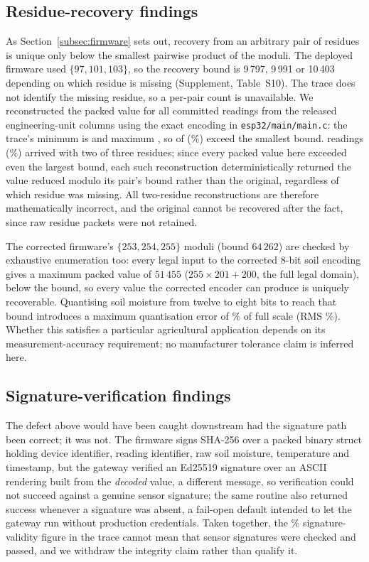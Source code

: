 \documentclass[a4paper,fleqn]{cas-dc}
\begin{document}
\subsection{Residue-recovery findings}
\label{subsec:pm_crt}

As Section~\ref{subsec:firmware} sets out, recovery from an arbitrary pair
of residues is unique only below the smallest pairwise product of the
moduli. The deployed firmware used $\{97, 101, 103\}$, so the recovery
bound is 9\,797, 9\,991 or 10\,403 depending on which residue is missing
(Supplement, Table~S10). The trace does not identify the missing residue,
so a per-pair count is unavailable. We reconstructed the packed
value for all \CRTExceedN{} committed readings from the released
engineering-unit columns using the exact encoding in
\texttt{esp32/main/main.c}: the trace's minimum is \CRTPackedMin{} and
maximum \CRTPackedMax{}, so \CRTExceedCount{} of \CRTExceedN{}
(\CRTExceedPct\%) exceed the smallest bound. \CRTRecovered{} readings
(\CRTLossRatePct\%) arrived with two of three residues; since every
packed value here exceeded even the largest bound, each such
reconstruction deterministically returned the value reduced modulo its
pair's bound rather than the original, regardless of which residue was
missing. All \CRTRecovered{} two-residue reconstructions are therefore
mathematically incorrect, and the original cannot be recovered after the
fact, since raw residue packets were not retained.

The corrected firmware's $\{253, 254, 255\}$ moduli (bound $64\,262$) are
checked by exhaustive enumeration too: every legal input to the corrected
8-bit soil encoding gives a maximum packed value of $51\,455$
($255 \times 201 + 200$, the full legal domain), below the bound, so
every value the corrected encoder can produce is uniquely recoverable.
Quantising soil moisture from twelve to eight bits to reach that bound
introduces a maximum quantisation error of \QuantErrMaxPct\% of full
scale (RMS \QuantErrRMSPct\%). Whether this satisfies a particular
agricultural application depends on its measurement-accuracy requirement;
no manufacturer tolerance claim is inferred here.

\subsection{Signature-verification findings}
\label{subsec:pm_signature}

The defect above would have been caught downstream had the signature path
been correct; it was not. The firmware signs SHA-256 over a packed binary
struct holding device identifier, reading identifier, raw soil moisture,
temperature and timestamp, but the gateway verified an Ed25519 signature
over an ASCII rendering built from the \emph{decoded} value, a different
message, so verification could not succeed against a genuine sensor
signature; the same routine also returned success whenever a signature
was absent, a fail-open default intended to let the gateway run without
production credentials. Taken together, the \SigValidPct\%
signature-validity figure in the trace cannot mean that sensor signatures
were checked and passed, and we withdraw the integrity claim rather than
qualify it.
\end{document}
